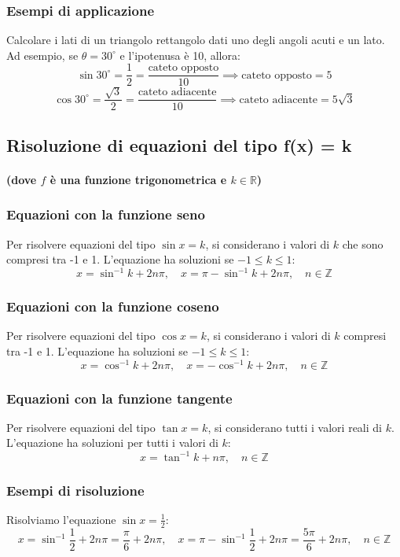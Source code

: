 \documentclass{article}
\begin{document}
\subsubsection{Esempi di applicazione}
Calcolare i lati di un triangolo rettangolo dati uno degli angoli acuti e un lato.
Ad esempio, se \(\theta = 30^\circ\) e l'ipotenusa è 10, allora:
\[
    \sin 30^\circ = \frac{1}{2} = \frac{\text{cateto opposto}}{10} \implies
    \text{cateto opposto} = 5
\]
\[
    \cos 30^\circ = \frac{\sqrt{3}}{2} = \frac{\text{cateto adiacente}}{10} \implies
    \text{cateto adiacente} = 5\sqrt{3}
\]

\newpage
\subsection{Risoluzione di equazioni del tipo f(x) = k}
\paragraph*{(dove \(f\) è una funzione trigonometrica e \(k \in \mathbb{R}\))}

\subsubsection{Equazioni con la funzione seno}
Per risolvere equazioni del tipo \(\sin x = k\), si considerano i valori di \(k\) che sono
compresi tra -1 e 1. L'equazione ha soluzioni se \(-1 \leq k \leq 1\):
\[
    x = \sin^{-1} k + 2n\pi, \quad x = \pi - \sin^{-1} k + 2n\pi, \quad n \in \mathbb{Z}
\]

\subsubsection{Equazioni con la funzione coseno}
Per risolvere equazioni del tipo \(\cos x = k\), si considerano i valori di \(k\) compresi
tra -1 e 1. L'equazione ha soluzioni se \(-1 \leq k \leq 1\):
\[
    x = \cos^{-1} k + 2n\pi, \quad x = -\cos^{-1} k + 2n\pi, \quad n \in \mathbb{Z}
\]

\subsubsection{Equazioni con la funzione tangente}
Per risolvere equazioni del tipo \(\tan x = k\), si considerano tutti i valori reali
di \(k\). L'equazione ha soluzioni per tutti i valori di \(k\):
\[
    x = \tan^{-1} k + n\pi, \quad n \in \mathbb{Z}
\]

\subsubsection{Esempi di risoluzione}
Risolviamo l'equazione \(\sin x = \frac{1}{2}\):
\[
    x = \sin^{-1} \frac{1}{2} + 2n\pi = \frac{\pi}{6} + 2n\pi,
    \quad x = \pi - \sin^{-1} \frac{1}{2} + 2n\pi = \frac{5\pi}{6} + 2n\pi,
    \quad n \in \mathbb{Z}
\]
\end{document}
